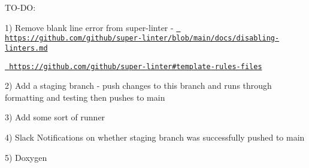 



TO-\/\+DO\+:

1) Remove blank line error from super-\/linter -\/ \href{https://github.com/github/super-linter/blob/main/docs/disabling-linters.md}{\texttt{ https\+://github.\+com/github/super-\/linter/blob/main/docs/disabling-\/linters.\+md}}
\begin{DoxyItemize}
\item \href{https://github.com/github/super-linter\#template-rules-files}{\texttt{ https\+://github.\+com/github/super-\/linter\#template-\/rules-\/files}}
\end{DoxyItemize}

2) Add a staging branch -\/ push changes to this branch and runs through formatting and testing then pushes to main

3) Add some sort of runner

4) Slack Notifications on whether staging branch was successfully pushed to main

5) Doxygen 
